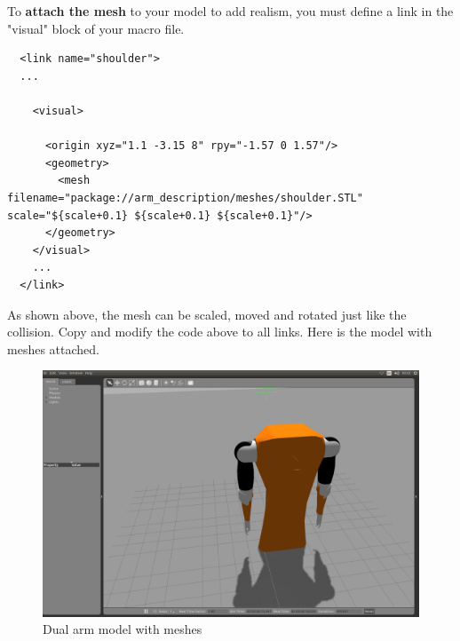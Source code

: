 \documentclass[pdftex,12pt,a4paper]{article}
\begin{document}
  \newpage
  To \textbf{attach the mesh} to your model to add realism, you must define a link in the "visual" block of your macro file.\\
  \begin{lstlisting}
  <link name="shoulder">
  ...
  
    <visual>
    
      <origin xyz="1.1 -3.15 8" rpy="-1.57 0 1.57"/>
      <geometry>
    	<mesh   filename="package://arm_description/meshes/shoulder.STL" scale="${scale+0.1} ${scale+0.1} ${scale+0.1}"/>
      </geometry>
    </visual>
    ...
  </link>
  \end{lstlisting}
  As shown above, the mesh can be scaled, moved and rotated just like the collision. Copy and modify the code above to all links. Here is the model with meshes attached.
  \begin{figure}[h]
      \centering
      \includegraphics[width=0.8\linewidth]{image/arm_gazebo.png}
      \caption{Dual arm model with meshes}
      \label{fig:arm_gazebo_mesh}
  \end{figure}
  
  \newpage
\end{document}
